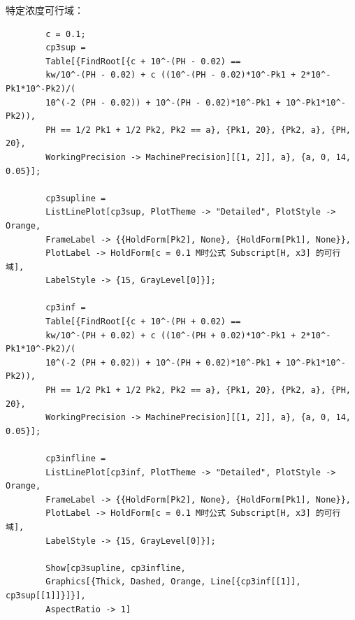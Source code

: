 \documentclass[UTF-8]{ctexart}
\newcommand{\0}{\boldsymbol{0}}
\begin{document}
    特定浓度可行域：
    \begin{lstlisting}
        c = 0.1;
        cp3sup = 
        Table[{FindRoot[{c + 10^-(PH - 0.02) == 
        kw/10^-(PH - 0.02) + c ((10^-(PH - 0.02)*10^-Pk1 + 2*10^-Pk1*10^-Pk2)/(
        10^(-2 (PH - 0.02)) + 10^-(PH - 0.02)*10^-Pk1 + 10^-Pk1*10^-Pk2)), 
        PH == 1/2 Pk1 + 1/2 Pk2, Pk2 == a}, {Pk1, 20}, {Pk2, a}, {PH, 20}, 
        WorkingPrecision -> MachinePrecision][[1, 2]], a}, {a, 0, 14, 0.05}];
        
        cp3supline = 
        ListLinePlot[cp3sup, PlotTheme -> "Detailed", PlotStyle -> Orange, 
        FrameLabel -> {{HoldForm[Pk2], None}, {HoldForm[Pk1], None}}, 
        PlotLabel -> HoldForm[c = 0.1 M时公式 Subscript[H, x3] 的可行域], 
        LabelStyle -> {15, GrayLevel[0]}];

        cp3inf = 
        Table[{FindRoot[{c + 10^-(PH + 0.02) == 
        kw/10^-(PH + 0.02) + c ((10^-(PH + 0.02)*10^-Pk1 + 2*10^-Pk1*10^-Pk2)/(
        10^(-2 (PH + 0.02)) + 10^-(PH + 0.02)*10^-Pk1 + 10^-Pk1*10^-Pk2)), 
        PH == 1/2 Pk1 + 1/2 Pk2, Pk2 == a}, {Pk1, 20}, {Pk2, a}, {PH, 20}, 
        WorkingPrecision -> MachinePrecision][[1, 2]], a}, {a, 0, 14, 0.05}];

        cp3infline = 
        ListLinePlot[cp3inf, PlotTheme -> "Detailed", PlotStyle -> Orange, 
        FrameLabel -> {{HoldForm[Pk2], None}, {HoldForm[Pk1], None}}, 
        PlotLabel -> HoldForm[c = 0.1 M时公式 Subscript[H, x3] 的可行域], 
        LabelStyle -> {15, GrayLevel[0]}];

        Show[cp3supline, cp3infline, 
        Graphics[{Thick, Dashed, Orange, Line[{cp3inf[[1]], cp3sup[[1]]}]}], 
        AspectRatio -> 1]
    \end{lstlisting}
\end{document}
